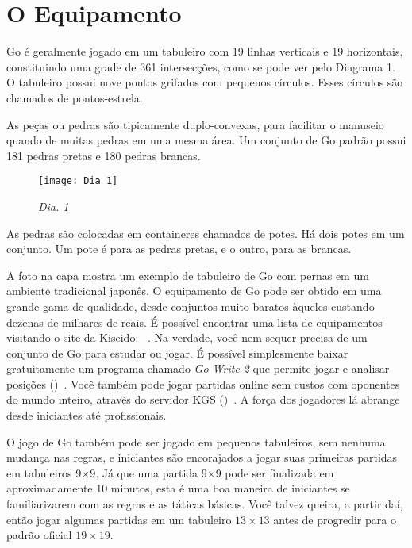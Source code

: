 \chapter{O Equipamento}

Go é geralmente jogado em um tabuleiro com 19 linhas verticais e 19 horizontais, constituindo uma grade de 361 intersecções, como se pode ver pelo Diagrama 1. O tabuleiro possui nove pontos grifados com pequenos círculos. Esses círculos são chamados de pontos-estrela.

As peças ou pedras são tipicamente duplo-convexas, para facilitar o manuseio quando de muitas pedras em uma mesma área. Um conjunto de Go padrão possui 181 pedras pretas e 180 pedras brancas.

\begin{wrapfigure}{r}{80mm}
    \begin{center}
        \texttt{[image: Dia 1]}
        \caption{\emph{Dia. 1}}
    \end{center}
\end{wrapfigure}

As pedras são colocadas em containeres chamados de potes. Há dois potes em um conjunto. Um pote é para as pedras pretas, e o outro, para as brancas.

A foto na capa mostra um exemplo de tabuleiro de Go com pernas em um ambiente tradicional japonês. O equipamento de Go pode ser obtido em uma grande gama de qualidade, desde conjuntos muito baratos àqueles custando dezenas de milhares de reais. É possível encontrar uma lista de equipamentos visitando o site da Kiseido: \href{https://www.kiseido.com}{}~\cite{kiseido}. Na verdade, você nem sequer precisa de um conjunto de Go para estudar ou jogar. É possível simplesmente baixar gratuitamente um programa chamado \emph{Go Write 2} que permite jogar e analisar posições (\href{https://www.gowrite.net/GOWrite2_download.html}{})~\cite{gowrite}. Você também pode jogar partidas online sem custos com oponentes do mundo inteiro, através do servidor KGS (\href{https://www.gokgs.com}{})~\cite{kgs}. A força dos jogadores lá abrange desde iniciantes até profissionais.

O jogo de Go também pode ser jogado em pequenos tabuleiros, sem nenhuma mudança nas regras, e iniciantes são encorajados a jogar suas primeiras partidas em tabuleiros 9\(\times\)9. Já que uma partida 9\(\times\)9 pode ser finalizada em aproximadamente 10 minutos, esta é uma boa maneira de iniciantes se familiarizarem com as regras e as táticas básicas. Você talvez queira, a partir daí, então jogar algumas partidas em um tabuleiro $13\times13$ antes de progredir para o padrão oficial $19\times19$.